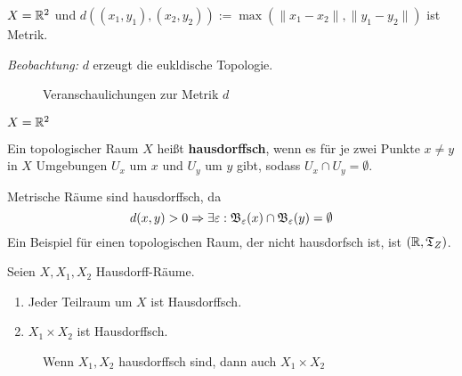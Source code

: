 \begin{beispiel}
    $X = \mathbb{R}^2$ und $d\left ((x_1, y_1), (x_2, y_2)\right ) := \max(\|x_1 - x_2\|, \|y_1 - y_2\|)$
    ist Metrik.

    \emph{Beobachtung:} $d$ erzeugt die eukldische Topologie.

    \begin{figure}[ht]
        \centering
        \subfigure[$\fB_r(0)$]{
            
            \label{fig:open-square}
        }%
        \label{fig:metrik}
        \caption{Veranschaulichungen zur Metrik $d$}
    \end{figure}

\end{beispiel}

\begin{beispiel} 
    $X = \mathbb{R}^2$ 

    
\end{beispiel}

\begin{definition} 
    Ein topologischer Raum $X$ heißt \textbf{hausdorffsch}, wenn es
    für je zwei Punkte $x \neq y$ in $X$ Umgebungen $U_x$ um $x$
    und $U_y$ um $y$ gibt, sodass $U_x \cap U_y = \emptyset$.
\end{definition}

\begin{bemerkung}[Trennungseigenschaft]
    Metrische Räume sind hausdorffsch, da 
    \[d(x,y) > 0 \Rightarrow \exists \varepsilon: \mathfrak{B}_\varepsilon(x) \cap \mathfrak{B}_\varepsilon(y) = \emptyset\]
    Ein Beispiel für einen topologischen Raum, der nicht hausdorfsch ist,
    ist $(\mathbb{R}, \mathfrak{T}_Z)$.
\end{bemerkung}

\begin{bemerkung}
    Seien $X, X_1, X_2$ Hausdorff-Räume.
    \begin{enumerate}[label=\alph*)]
        \item Jeder Teilraum um $X$ ist Hausdorffsch.
        \item $X_1 \times X_2$ ist Hausdorffsch.
    \end{enumerate}
    \begin{figure}[htp]
        \centering
        
        \caption{Wenn $X_1, X_2$ hausdorffsch sind, dann auch $X_1 \times X_2$}
    \end{figure}
\end{bemerkung}

